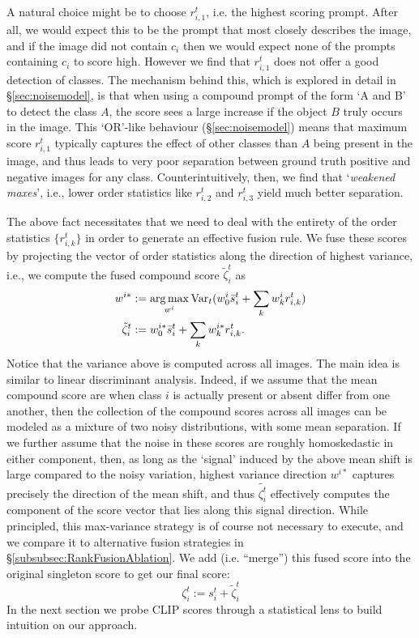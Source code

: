 A natural choice might be to choose $r_{i,1}^t$, i.e. the highest scoring prompt. After all, we would expect this to be the prompt that most closely describes the image, and if the image did not contain $c_i$ then we would expect none of the prompts containing $c_i$ to score high. However we find that $r_{i,1}^t$ does not offer a good detection of classes. The mechanism behind this, which is explored in detail in \S\ref{sec:noisemodel}, is that when using a compound prompt of the form `A and B' to detect the class $A$, the score sees a large increase if the object $B$ truly occurs in the image. This `OR'-like behaviour (\S\ref{sec:noisemodel}) means that maximum score $r_{i,1}^t$ typically captures the effect of other classes than $A$ being present in the image, and thus leads to very poor separation between ground truth positive and negative images for any class. Counterintuitively, then, we find that `\emph{weakened maxes}', i.e., lower order statistics like $r_{i,2}^t$ and $r_{i,3}^t$ yield much better separation. 

The above fact necessitates that we need to deal with the entirety of the order statistics $\{r_{i,k}^t\}$ in order to generate an effective fusion rule. We fuse these scores by projecting the vector of order statistics along the direction of highest variance, i.e., we compute the fused compound score $\tilde{\zeta}_i^t$ as
\begin{align}
\label{eq:maxVariance}
w^{i*} &:= \mathop\mathrm{arg\, max}_{w^i} \textrm{Var}_t(w_0^i \bar{s}_i^t + \sum_{k} w_k^i r_{i,k}^t )\\
\tilde{\zeta}_i^t &:= w_0^{i*} \bar{s}_i^t + \sum_{k} w_k^{i*} r_{i,k}^t. \label{eqn:pca_projection}
\end{align}
Notice that the variance above is computed across all images. The main idea is similar to linear discriminant analysis. Indeed, if we assume that the mean compound score are when class $i$ is actually present or absent differ from one another, then the collection of the compound scores across all images can be modeled as a mixture of two noisy distributions, with some mean separation. If we further assume that the noise in these scores are roughly homoskedastic in either component, then, as long as the `signal' induced by the above mean shift is large compared to the noisy variation, highest variance direction $w^{i*}$ captures precisely the direction of the mean shift, and thus $\tilde{\zeta_i^t}$ effectively computes the component of the score vector that lies along this signal direction. While principled, this max-variance strategy is of course not necessary to execute, and we compare it to alternative fusion strategies in \S\ref{subsubsec:RankFusionAblation}. We add (i.e. ``merge'') this fused score into the original singleton score to get our final score:
\begin{equation}
\label{eq:merge}
\zeta_i^t := s_i^t + \tilde{\zeta}_i^t
\end{equation}
In the next section we probe CLIP scores through a statistical lens to build intuition on our approach.
